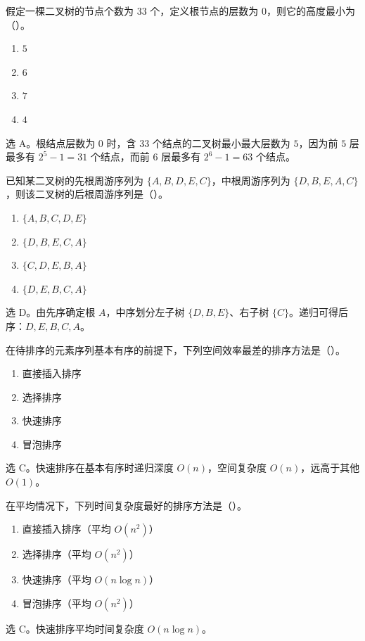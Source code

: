 \begin{question}
假定一棵二叉树的节点个数为 $33$ 个，定义根节点的层数为 $0$，则它的高度最小为（\quad）。
\begin{enumerate}
  \item $5$
  \item $6$
  \item $7$
  \item $4$
\end{enumerate}
\begin{solution}
选 A。根结点层数为 $0$ 时，含 $33$ 个结点的二叉树最小最大层数为 $5$，因为前 $5$ 层最多有 $2^5-1=31$ 个结点，而前 $6$ 层最多有 $2^6-1=63$ 个结点。
\end{solution}
\end{question}

\begin{question}
已知某二叉树的先根周游序列为 $\{A,B,D,E,C\}$，中根周游序列为 $\{D,B,E,A,C\}$，则该二叉树的后根周游序列是（\quad）。
\begin{enumerate}
  \item $\{A,B,C,D,E\}$
  \item $\{D,B,E,C,A\}$
  \item $\{C,D,E,B,A\}$
  \item $\{D,E,B,C,A\}$
\end{enumerate}
\begin{solution}
选 D。由先序确定根 $A$，中序划分左子树 $\{D,B,E\}$、右子树 $\{C\}$。递归可得后序：$D,E,B,C,A$。
\end{solution}
\end{question}

\begin{question}
在待排序的元素序列基本有序的前提下，下列空间效率最差的排序方法是（\quad）。
\begin{enumerate}
  \item 直接插入排序
  \item 选择排序
  \item 快速排序
  \item 冒泡排序
\end{enumerate}
\begin{solution}
选 C。快速排序在基本有序时递归深度 $O(n)$，空间复杂度 $O(n)$，远高于其他 $O(1)$。
\end{solution}
\end{question}

\begin{question}
在平均情况下，下列时间复杂度最好的排序方法是（\quad）。
\begin{enumerate}
  \item 直接插入排序（平均 $O(n^2)$）
  \item 选择排序（平均 $O(n^2)$）
  \item 快速排序（平均 $O(n\log n)$）
  \item 冒泡排序（平均 $O(n^2)$）
\end{enumerate}
\begin{solution}
选 C。快速排序平均时间复杂度 $O(n\log n)$。
\end{solution}
\end{question}


